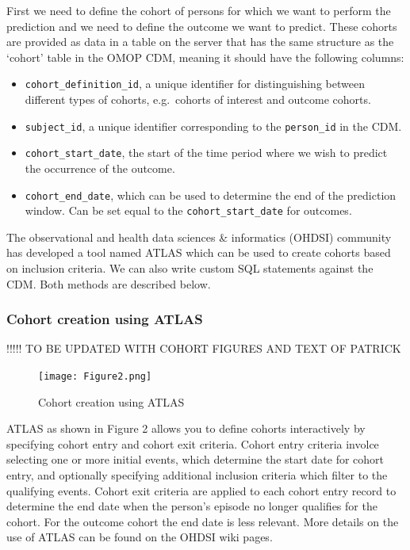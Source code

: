 \documentclass[]{article}
\providecommand{\tightlist}{%
  \setlength{\itemsep}{0pt}\setlength{\parskip}{0pt}}
\begin{document}
First we need to define the cohort of persons for which we want to
perform the prediction and we need to define the outcome we want to
predict. These cohorts are provided as data in a table on the server
that has the same structure as the `cohort' table in the OMOP CDM,
meaning it should have the following columns:

\begin{itemize}
\tightlist
\item
  \texttt{cohort\_definition\_id}, a unique identifier for
  distinguishing between different types of cohorts, e.g.~cohorts of
  interest and outcome cohorts.
\item
  \texttt{subject\_id}, a unique identifier corresponding to the
  \texttt{person\_id} in the CDM.
\item
  \texttt{cohort\_start\_date}, the start of the time period where we
  wish to predict the occurrence of the outcome.
\item
  \texttt{cohort\_end\_date}, which can be used to determine the end of
  the prediction window. Can be set equal to the
  \texttt{cohort\_start\_date} for outcomes.
\end{itemize}

The observational and health data sciences \& informatics (OHDSI)
community has developed a tool named ATLAS which can be used to create
cohorts based on inclusion criteria. We can also write custom SQL
statements against the CDM. Both methods are described below.

\subsubsection{Cohort creation using
ATLAS}\label{cohort-creation-using-atlas}

!!!!! TO BE UPDATED WITH COHORT FIGURES AND TEXT OF PATRICK

\begin{figure}
\centering
\texttt{[image: Figure2.png]}
\caption{Cohort creation using ATLAS}
\end{figure}

ATLAS as shown in Figure 2 allows you to define cohorts interactively by
specifying cohort entry and cohort exit criteria. Cohort entry criteria
involce selecting one or more initial events, which determine the start
date for cohort entry, and optionally specifying additional inclusion
criteria which filter to the qualifying events. Cohort exit criteria are
applied to each cohort entry record to determine the end date when the
person's episode no longer qualifies for the cohort. For the outcome
cohort the end date is less relevant. More details on the use of ATLAS
can be found on the OHDSI wiki pages.
\end{document}
